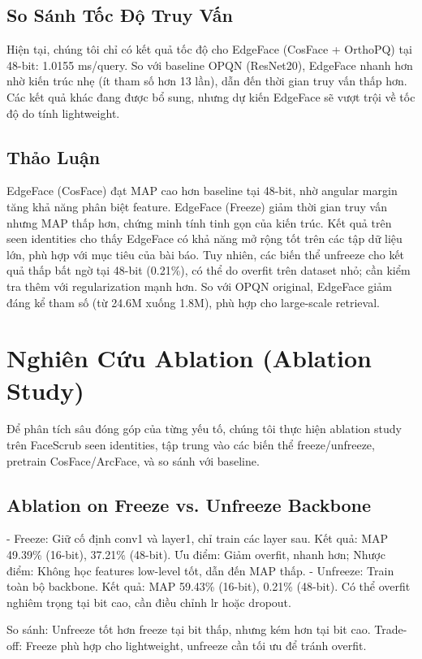 \subsection{So Sánh Tốc Độ Truy Vấn}
Hiện tại, chúng tôi chỉ có kết quả tốc độ cho EdgeFace (CosFace + OrthoPQ) tại 48-bit: 1.0155 ms/query. So với baseline OPQN (ResNet20), EdgeFace nhanh hơn nhờ kiến trúc nhẹ (ít tham số hơn 13 lần), dẫn đến thời gian truy vấn thấp hơn. Các kết quả khác đang được bổ sung, nhưng dự kiến EdgeFace sẽ vượt trội về tốc độ do tính lightweight.

\subsection{Thảo Luận}
EdgeFace (CosFace) đạt MAP cao hơn baseline tại 48-bit, nhờ angular margin tăng khả năng phân biệt feature. EdgeFace (Freeze) giảm thời gian truy vấn nhưng MAP thấp hơn, chứng minh tính tinh gọn của kiến trúc. Kết quả trên seen identities cho thấy EdgeFace có khả năng mở rộng tốt trên các tập dữ liệu lớn, phù hợp với mục tiêu của bài báo. Tuy nhiên, các biến thể unfreeze cho kết quả thấp bất ngờ tại 48-bit (0.21\%), có thể do overfit trên dataset nhỏ; cần kiểm tra thêm với regularization mạnh hơn. So với OPQN original, EdgeFace giảm đáng kể tham số (từ 24.6M xuống 1.8M), phù hợp cho large-scale retrieval.

\section{Nghiên Cứu Ablation (Ablation Study)}
Để phân tích sâu đóng góp của từng yếu tố, chúng tôi thực hiện ablation study trên FaceScrub seen identities, tập trung vào các biến thể freeze/unfreeze, pretrain CosFace/ArcFace, và so sánh với baseline.

\subsection{Ablation on Freeze vs. Unfreeze Backbone}
- Freeze: Giữ cố định conv1 và layer1, chỉ train các layer sau. Kết quả: MAP 49.39\% (16-bit), 37.21\% (48-bit). Ưu điểm: Giảm overfit, nhanh hơn; Nhược điểm: Không học features low-level tốt, dẫn đến MAP thấp.
- Unfreeze: Train toàn bộ backbone. Kết quả: MAP 59.43\% (16-bit), 0.21\% (48-bit). Có thể overfit nghiêm trọng tại bit cao, cần điều chỉnh lr hoặc dropout.

So sánh: Unfreeze tốt hơn freeze tại bit thấp, nhưng kém hơn tại bit cao. Trade-off: Freeze phù hợp cho lightweight, unfreeze cần tối ưu để tránh overfit.

